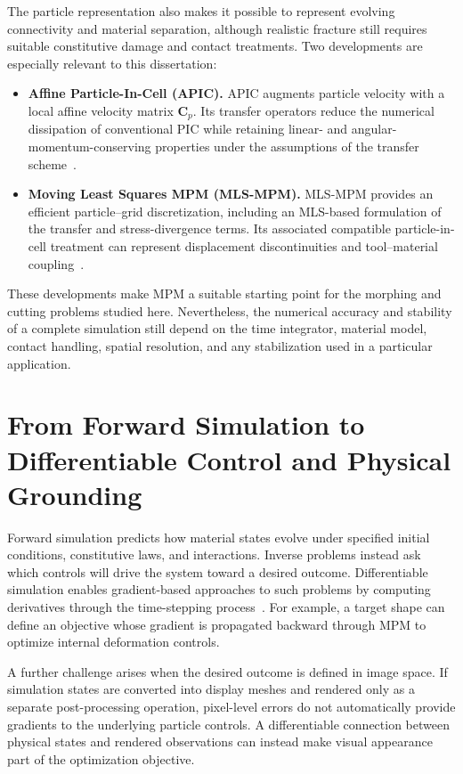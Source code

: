     The particle representation also makes it possible to represent evolving connectivity and material separation, although realistic fracture still requires suitable constitutive damage and contact treatments. Two developments are especially relevant to this dissertation:
    \begin{itemize}
        \item \textbf{Affine Particle-In-Cell (APIC).} APIC augments particle velocity with a local affine velocity matrix $\mathbf{C}_p$. Its transfer operators reduce the numerical dissipation of conventional PIC while retaining linear- and angular-momentum-conserving properties under the assumptions of the transfer scheme~\citep{2015-APIC,jiang2017angular}.
        \item \textbf{Moving Least Squares MPM (MLS-MPM).} MLS-MPM provides an efficient particle--grid discretization, including an MLS-based formulation of the transfer and stress-divergence terms. Its associated compatible particle-in-cell treatment can represent displacement discontinuities and tool--material coupling~\citep{2018-MLSMPM}.
    \end{itemize}
    
    These developments make MPM a suitable starting point for the morphing and cutting problems studied here. Nevertheless, the numerical accuracy and stability of a complete simulation still depend on the time integrator, material model, contact handling, spatial resolution, and any stabilization used in a particular application.

\section{From Forward Simulation to Differentiable Control and Physical Grounding}
    Forward simulation predicts how material states evolve under specified initial conditions, constitutive laws, and interactions. Inverse problems instead ask which controls will drive the system toward a desired outcome. Differentiable simulation enables gradient-based approaches to such problems by computing derivatives through the time-stepping process~\citep{2018-ChainQueen,coros2021differentiable,10.1145/3527660}. For example, a target shape can define an objective whose gradient is propagated backward through MPM to optimize internal deformation controls.
    
    A further challenge arises when the desired outcome is defined in image space. If simulation states are converted into display meshes and rendered only as a separate post-processing operation, pixel-level errors do not automatically provide gradients to the underlying particle controls. A differentiable connection between physical states and rendered observations can instead make visual appearance part of the optimization objective.
    
